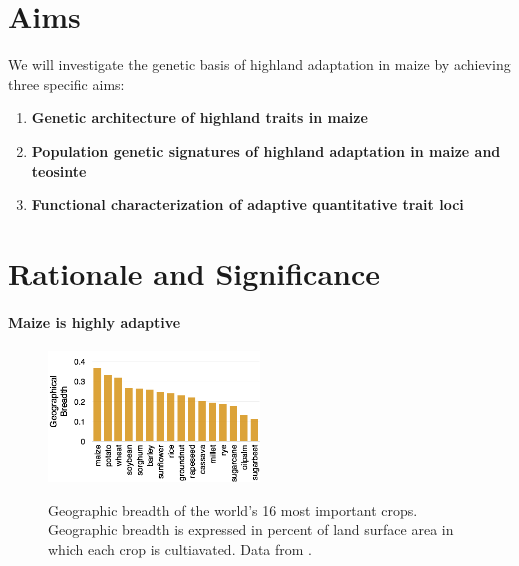 
\section*{Aims}

We will investigate the genetic basis of highland adaptation in maize by achieving three specific aims:

\begin{enumerate}
\item {\bf Genetic architecture of highland traits in maize}
\item {\bf Population genetic signatures of highland adaptation in maize and teosinte}
\item {\bf Functional characterization of adaptive quantitative trait loci}
\end{enumerate}

\section*{Rationale and Significance}

\paragraph*{Maize is highly adaptive}

\begin{figure}
  \centering
  \caption{Geographic breadth of the world's 16 most important crops. Geographic breadth is expressed in percent of land surface area in which each crop is cultiavated. Data from \citet{Ramankutty2008}. } 
   \includegraphics[width=0.5\textwidth]{breadth.png}
\label{fig:breadth}
\end{figure}



